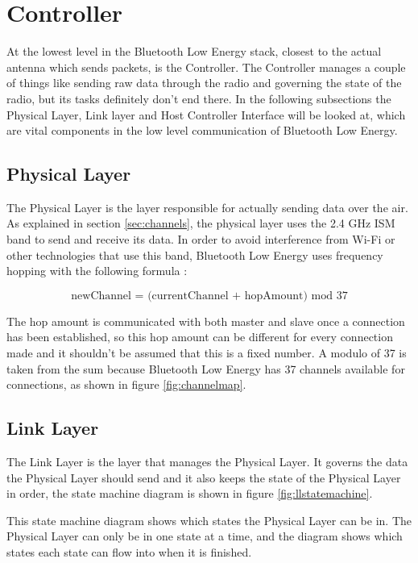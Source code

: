\documentclass[pdftex,a4paper,12pt,twoside]{report}
\begin{document}
\newpage{}

\section{Controller}
\label{sec:stackController}
At the lowest level in the Bluetooth Low Energy stack, closest to the actual antenna which sends packets, is the Controller. The Controller manages a couple of things like sending raw data through the radio and governing the state of the radio, but its tasks definitely don't end there. In the following subsections the Physical Layer, Link layer and Host Controller Interface will be looked at, which are vital components in the low level communication of Bluetooth Low Energy.

\subsection{Physical Layer}
\label{subsec:controllerPHY}
The Physical Layer is the layer responsible for actually sending data over the air. As explained in section \ref{sec:channels}, the physical layer uses the 2.4 GHz ISM band to send and receive its data. In order to avoid interference from Wi-Fi or other technologies that use this band, Bluetooth Low Energy uses frequency hopping with the following formula \citep{heydon2012bluetooth}:

\begin{equation*}
\text{newChannel = (currentChannel + hopAmount) mod 37}
\end{equation*}

The hop amount is communicated with both master and slave once a connection has been established, so this hop amount can be different for every connection made and it shouldn't be assumed that this is a fixed number. A modulo of 37 is taken from the sum because Bluetooth Low Energy has 37 channels available for connections, as shown in figure \ref{fig:channelmap}.

\subsection{Link Layer}
\label{subsec:controllerLL}
The Link Layer is the layer that manages the Physical Layer. It governs the data the Physical Layer should send and it also keeps the state of the Physical Layer in order, the state machine diagram is shown in figure \ref{fig:llstatemachine}. 

This state machine diagram shows which states the Physical Layer can be in. The Physical Layer can only be in one state at a time, and the diagram shows which states each state can flow into when it is finished.
\end{document}
